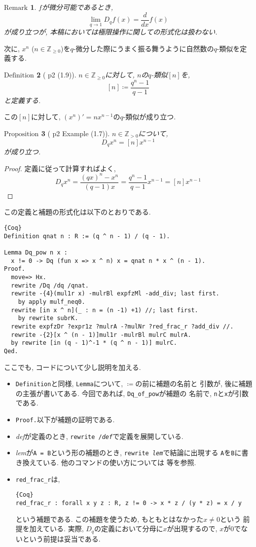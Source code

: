\documentclass[11pt]{jarticle}
\theoremstyle{mystyle}
\newtheorem{df}{$\textrm{Definition}$}[subsubsection]
\newtheorem{prop}[df]{$\textrm{Proposition}$}
\newtheorem{rmk}[df]{$\textrm{Remark}$}
\newcommand{\bdf}{\begin{shadebox} \begin{df}}
\newcommand{\edf}{\end{df} \end{shadebox}}
\newcommand{\bprop}{\begin{shadebox} \begin{prop}}
\newcommand{\eprop}{\end{prop} \end{shadebox}}
\newcommand{\brmk}{\begin{rmk}}
\newcommand{\ermk}{\end{rmk}}
\newcommand{\bpf}{\begin{proof}}
\newcommand{\epf}{\end{proof}}
\newcommand{\Z}{\mathbb{Z}}
\newcommand{\ra}{\rightarrow}
\newcommand{\0}{\textbf{0}}
\newcommand{\1}{\textbf{1}}
\newcommand{\2}{\textbf{2}}
\begin{document}
\brmk
  $f$が微分可能であるとき, 
  \[
    \lim_{q\ra1} D_qf(x) = \frac{d}{dx}f(x)
  \] 
  が成り立つが, 本稿においては極限操作に関しての形式化は扱わない. 
\ermk
次に, $x ^ n$ ($n \in \Z_{\ge 0}$)を$q$-微分した際にうまく振る舞うように自然数の$q$-類似を定義する. 
\bdf[\cite{Kac} p2 (1.9)]
  $n \in \Z_{\ge 0}$に対して, $n$の$q$-類似$[n]$を, 
  \[
    [n] \coloneqq \frac{q^n - 1}{q - 1}
  \]
  と定義する. 
\edf
この$[n]$に対して, $(x^n)' = n x^{n-1}$の$q$-類似が成り立つ.
\bprop[\cite{Kac} p2 Example (1.7)]
  $n \in \Z_{>0}$について, 
  \[
    D_q x^n = [n] x ^{n - 1}
  \]
  が成り立つ. 
\eprop
\bpf
  定義に従って計算すればよく, 
  \[
    D_q x ^ n = \frac{(qx) ^ n - x ^ n}{(q - 1) x}
                 = \frac{q^n - 1}{q - 1} x ^ {n - 1}
                 = [n] x ^ {n - 1}
  \] 
\epf
この定義と補題の形式化は以下のとおりである. 
\begin{lstlisting}{Coq}
Definition qnat n : R := (q ^ n - 1) / (q - 1).

Lemma Dq_pow n x :
  x != 0 -> Dq (fun x => x ^ n) x = qnat n * x ^ (n - 1).
Proof.
  move=> Hx.
  rewrite /Dq /dq /qnat.
  rewrite -{4}(mul1r x) -mulrBl expfzMl -add_div; last first.
    by apply mulf_neq0.
  rewrite [in x ^ n](_ : n = (n -1) +1) //; last first.
    by rewrite subrK.
  rewrite expfzDr ?expr1z ?mulrA -?mulNr ?red_frac_r ?add_div //.
  rewrite -{2}[x ^ (n - 1)]mul1r -mulrBl mulrC mulrA.
  by rewrite [in (q - 1)^-1 * (q ^ n - 1)] mulrC.
Qed.
\end{lstlisting}
ここでも, コードについて少し説明を加える. 
\begin{itemize}
  \item {\tt Definition}と同様, {\tt Lemma}について, {\tt $\coloneqq$}の前に補題の名前と
          引数が, 後に補題の主張が書いてある. 今回であれば, {\tt Dq\_of\_pow}が補題の
          名前で, {\tt n}と{\tt x}が引数である. 
  \item {\tt Proof.}以下が補題の証明である. 
  \item {\it def}が定義のとき, {\tt rewrite /{\it def}}で定義を展開している. 
  \item {\it lem}が{\tt A = B}という形の補題のとき, {\tt rewrite {\it lem}}で結論に出現する
          {\tt A}を{\tt B}に書き換えている. 他のコマンドの使い方については \cite{Hag}等を参照. 
  \item {\tt red\_frac\_r}は, 
           \begin{lstlisting}{Coq}
red_frac_r : forall x y z : R, z != 0 -> x * z / (y * z) = x / y \end{lstlisting}
           という補題である. この補題を使うため, もともとはなかった{\tt $x \ne 0$}という
           前提を加えている. 実際, $D_q$の定義において分母に$x$が出現するので, 
           $x$が$0$でないという前提は妥当である.  
\end{itemize}
\end{document}
